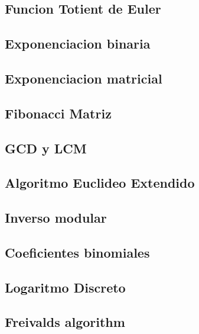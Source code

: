 \subsection{Funcion Totient de Euler}
\raggedbottom
\hrulefill
\subsection{Exponenciacion binaria}
\raggedbottom
\hrulefill
\subsection{Exponenciacion matricial}
\raggedbottom
\hrulefill
\subsection{Fibonacci Matriz}
\raggedbottom
\hrulefill
\subsection{GCD y LCM}
\raggedbottom
\hrulefill
\subsection{Algoritmo Euclideo Extendido}
\raggedbottom
\hrulefill
\subsection{Inverso modular}
\raggedbottom
\hrulefill
\subsection{Coeficientes binomiales}
\raggedbottom
\hrulefill
\subsection{Logaritmo Discreto}
\raggedbottom
\hrulefill
\subsection{Freivalds algorithm}
\raggedbottom
\hrulefill

